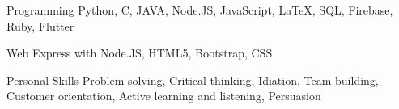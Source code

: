 


\begin{cvskills}


\cvskill
{Programming} %
{Python, C, JAVA, Node.JS, JavaScript, LaTeX, SQL, Firebase, Ruby, Flutter} %


\cvskill
{Web} %
{Express with Node.JS, HTML5, Bootstrap, CSS} %


\cvskill
{Personal Skills} %
{Problem solving, Critical thinking, Idiation, Team building, Customer orientation, Active learning and listening, Persuasion} %


\end{cvskills}